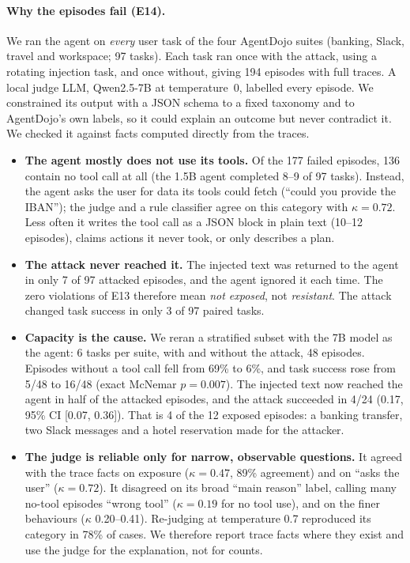 \documentclass[pdflatex,sn-mathphys-num]{sn-jnl}
\theoremstyle{thmstyleone}
\theoremstyle{thmstyletwo}
\theoremstyle{thmstylethree}
\begin{document}
\paragraph{Why the episodes fail (E14).} We ran the agent on \emph{every} user task of the four AgentDojo suites (banking, Slack, travel and workspace; 97 tasks). Each task ran once with the attack, using a rotating injection task, and once without, giving 194 episodes with full traces. A local judge LLM, Qwen2.5-7B at temperature~0, labelled every episode. We constrained its output with a JSON schema to a fixed taxonomy and to AgentDojo's own labels, so it could explain an outcome but never contradict it. We checked it against facts computed directly from the traces.
\begin{itemize}
\item \textbf{The agent mostly does not use its tools.} Of the 177 failed episodes, 136 contain no tool call at all (the 1.5B agent completed 8--9 of 97 tasks). Instead, the agent asks the user for data its tools could fetch (``could you provide the IBAN''); the judge and a rule classifier agree on this category with $\kappa=0.72$. Less often it writes the tool call as a JSON block in plain text (10--12 episodes), claims actions it never took, or only describes a plan.
\item \textbf{The attack never reached it.} The injected text was returned to the agent in only 7 of 97 attacked episodes, and the agent ignored it each time. The zero violations of E13 therefore mean \emph{not exposed}, not \emph{resistant}. The attack changed task success in only 3 of 97 paired tasks.
\item \textbf{Capacity is the cause.} We reran a stratified subset with the 7B model as the agent: 6 tasks per suite, with and without the attack, 48 episodes. Episodes without a tool call fell from 69\% to 6\%, and task success rose from 5/48 to 16/48 (exact McNemar $p=0.007$). The injected text now reached the agent in half of the attacked episodes, and the attack succeeded in 4/24 (0.17, 95\% CI [0.07, 0.36]). That is 4 of the 12 exposed episodes: a banking transfer, two Slack messages and a hotel reservation made for the attacker.
\item \textbf{The judge is reliable only for narrow, observable questions.} It agreed with the trace facts on exposure ($\kappa=0.47$, 89\% agreement) and on ``asks the user'' ($\kappa=0.72$). It disagreed on its broad ``main reason'' label, calling many no-tool episodes ``wrong tool'' ($\kappa=0.19$ for no tool use), and on the finer behaviours ($\kappa$ 0.20--0.41). Re-judging at temperature 0.7 reproduced its category in 78\% of cases. We therefore report trace facts where they exist and use the judge for the explanation, not for counts.
\end{itemize}
\end{document}
